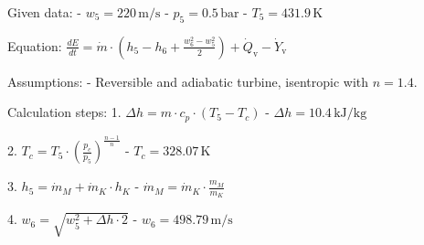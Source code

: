 Given data:  
- \( w_5 = 220 \, \text{m/s} \)  
- \( p_5 = 0.5 \, \text{bar} \)  
- \( T_5 = 431.9 \, \text{K} \)  

Equation:  
\( \frac{dE}{dt} = \dot{m} \cdot (h_5 - h_6 + \frac{w_6^2 - w_5^2}{2}) + \dot{Q}_{\text{v}} - \dot{Y}_{\text{v}} \)  

Assumptions:  
- Reversible and adiabatic turbine, isentropic with \( n = 1.4 \).  

Calculation steps:  
1. \( \Delta h = m \cdot c_p \cdot (T_5 - T_c) \)  
   - \( \Delta h = 10.4 \, \text{kJ/kg} \)  

2. \( T_c = T_5 \cdot (\frac{p_c}{p_5})^{\frac{n-1}{n}} \)  
   - \( T_c = 328.07 \, \text{K} \)  

3. \( h_5 = \dot{m}_M + \dot{m}_K \cdot h_K \)  
   - \( \dot{m}_M = \dot{m}_K \cdot \frac{m_M}{m_K} \)  

4. \( w_6 = \sqrt{w_5^2 + \Delta h \cdot 2} \)  
   - \( w_6 = 498.79 \, \text{m/s} \)